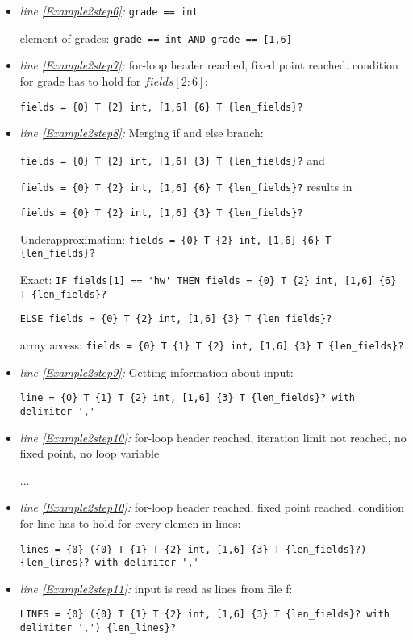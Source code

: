 \documentclass[11pt]{article}
\begin{document}
\begin{itemize}
\item \textit{line \ref{Example2step6}:} \verb|grade == int|

element of grades: \verb|grade == int AND grade == [1,6]|

\item \textit{line \ref{Example2step7}:} for-loop header reached, fixed point reached. condition for grade has to hold for $fields[2:6]$:

\verb|fields = {0} T {2} int, [1,6] {6} T {len_fields}?|

\item \textit{line \ref{Example2step8}:} Merging if and else branch: 

\verb|fields = {0} T {2} int, [1,6] {3} T {len_fields}?| and 

\verb|fields = {0} T {2} int, [1,6] {6} T {len_fields}?| results in

\verb|fields = {0} T {2} int, [1,6] {3} T {len_fields}?|

Underapproximation: \verb|fields = {0} T {2} int, [1,6] {6} T {len_fields}?|

Exact: \verb|IF fields[1] == 'hw' THEN fields = {0} T {2} int, [1,6] {6} T {len_fields}?|

\verb|ELSE fields = {0} T {2} int, [1,6] {3} T {len_fields}?|

array access: \verb|fields = {0} T {1} T {2} int, [1,6] {3} T {len_fields}?|

\item \textit{line \ref{Example2step9}:} Getting information about input: 

\verb|line = {0} T {1} T {2} int, [1,6] {3} T {len_fields}? with delimiter ','|

\item \textit{line \ref{Example2step10}:} for-loop header reached, iteration limit not reached, no fixed point, no loop variable

...

\item \textit{line \ref{Example2step10}:} for-loop header reached, fixed point reached. condition for line has to hold for every elemen in lines:

\verb|lines = {0} ({0} T {1} T {2} int, [1,6] {3} T {len_fields}?) {len_lines}? with delimiter ','|

\item \textit{line \ref{Example2step11}:} input is read as lines from file f:

\verb|LINES = {0} ({0} T {1} T {2} int, [1,6] {3} T {len_fields}? with delimiter ',') {len_lines}?|


\end{itemize}
\end{document}
